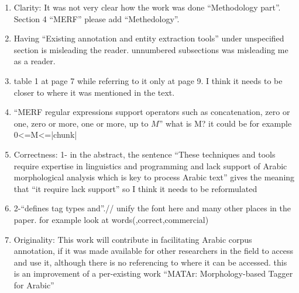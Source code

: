 \begin{enumerate}[leftmargin=0mm,label=\bfseries CommentR3.\arabic*]
\item \label{Review.3.28}
Clarity:  
It was not very clear how the work was done 
``Methodology part''. 
Section 4 ``MERF'' please add ``Methedology''.



\item \label{Review.3.29}
Having ``Existing annotation and entity extraction tools'' 
under unspecified section is misleading the reader. 
unnumbered subsections was misleading me as a reader. 


\item \label{Review.3.30}
table 1 at page 7 while referring to it only at page 9. 
I think it needs to be closer to where it was mentioned in the text. 


\item \label{Review.3.31}
``MERF regular expressions support operators such as concatenation, zero or one, zero or more, one or more, up to $M$” what is M? 
it could be for example 0<=M<=|chunk| 




\item \label{Review.3.32}
Correctness: 
1- in the abstract, the sentence ``These techniques and 
tools require expertise in linguistics and programming and 
lack support of Arabic morphological analysis which is key to 
process Arabic text''
gives the meaning that ``it require lack support'' so I think it 
needs to be reformulated 



\item \label{Review.3.33}
2-``defines tag types and''.// unify the font here and 
many other places in the paper. 
for example look at words(,correct,commercial)


\item \label{Review.3.34}
Originality:  
This work will contribute in facilitating Arabic corpus 
annotation, if it was made available for other researchers in 
the field to access and use it, although there is no 
referencing to where it can be accessed. 
this is an improvement of a per-existing work ``MATAr: Morphology-based Tagger for Arabic''



\end{enumerate}
